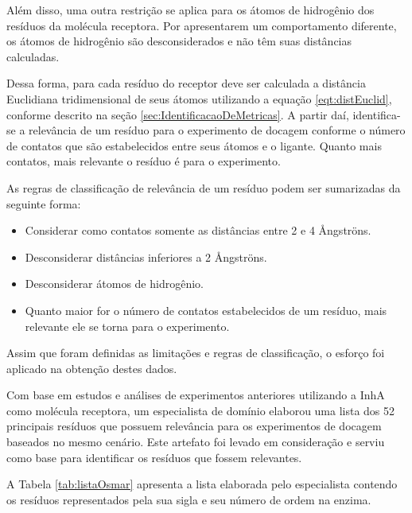 Além disso, uma outra restrição se aplica para os átomos de hidrogênio dos resíduos da molécula receptora. Por apresentarem um comportamento diferente, os átomos de hidrogênio são desconsiderados e não têm suas distâncias calculadas.

Dessa forma, para cada resíduo do receptor deve ser calculada a distância Euclidiana tridimensional de seus átomos utilizando a equação \ref{eqt:distEuclid}, conforme descrito na seção \ref{sec:IdentificacaoDeMetricas}. A partir daí, identifica-se a relevância de um resíduo para o experimento de docagem conforme o número de contatos que são estabelecidos entre seus átomos e o ligante. Quanto mais contatos, mais relevante o resíduo é para o experimento.

As regras de classificação de relevância de um resíduo podem ser sumarizadas da seguinte forma:
\begin{itemize}
	\item Considerar como contatos somente as distâncias entre 2 e 4 {\AA}ngstr\"ons.
	\item Desconsiderar distâncias inferiores a 2 {\AA}ngstr\"ons.
	\item Desconsiderar átomos de hidrogênio.
	\item Quanto maior for o número de contatos estabelecidos de um resíduo, mais relevante ele se torna para o experimento.
\end{itemize}

Assim que foram definidas as limitações e regras de classificação, o esforço foi aplicado na obtenção destes dados. 

Com base em estudos e análises de experimentos anteriores utilizando a InhA como molécula receptora, um especialista de domínio elaborou uma lista dos 52 principais resíduos que possuem relevância para os experimentos de docagem baseados no mesmo cenário. Este artefato foi levado em consideração e serviu como base para identificar os resíduos que fossem relevantes. 

A Tabela \ref{tab:listaOsmar} apresenta a lista elaborada pelo especialista contendo os resíduos representados pela sua sigla e seu número de ordem na enzima.

